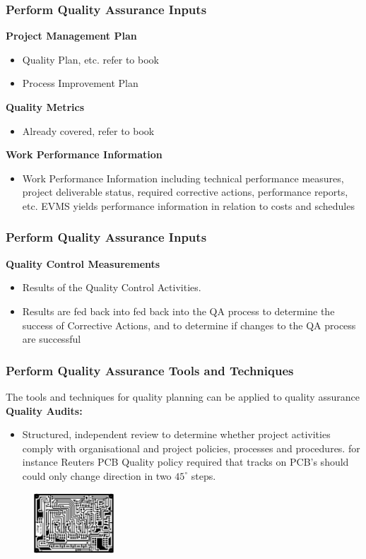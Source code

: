 \begin{frame}
\frametitle{Perform Quality Assurance \hfill Inputs}
\textbf{Project Management Plan}
\begin{itemize}
	\item Quality Plan, etc. refer to book
	\item Process Improvement Plan
\end{itemize}
\textbf{Quality Metrics}
\begin{itemize}	
	\item Already covered, refer to book
\end{itemize}
\textbf{Work Performance Information}
\begin{itemize}
	\item Work Performance Information including technical performance measures, project deliverable status, required corrective actions, performance reports, etc. EVMS yields performance information in relation to costs and schedules
\end{itemize}
\end{frame}




\begin{frame}
\frametitle{Perform Quality Assurance \hfill Inputs}
\textbf{Quality Control Measurements}
\begin{itemize}
	\item Results of the Quality Control Activities.
	\item Results are fed back into fed back into the QA process to determine the success of Corrective Actions, and to determine if changes to the QA process are successful
\end{itemize}
\end{frame}




\begin{frame}
\frametitle{Perform Quality Assurance \hfill Tools and Techniques}
The tools and techniques for quality planning can be applied to quality assurance\\
\textbf{Quality Audits:}
\begin{itemize}
	\item Structured, independent review to determine whether project activities comply with organisational and project policies, processes and procedures. for instance Reuters PCB Quality policy required that tracks on PCB's should could only change direction in two $45^\circ$ steps. 
\end{itemize}
\begin{figure}
	\centering
		\includegraphics[width = 3cm]{images/pcb.jpg}
	\label{fig:pcb}
\end{figure}
\end{frame}




